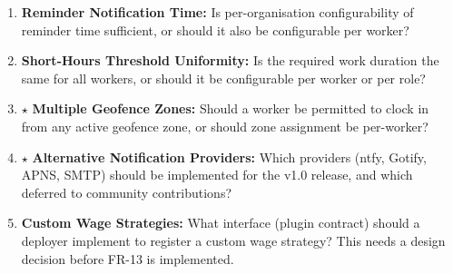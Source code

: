 \documentclass[12pt, a4paper]{article}
\begin{document}
\begin{enumerate}
          an expense offline and the balance would go negative upon sync,
          how should the conflict be resolved?
    \item \textbf{Reminder Notification Time:} Is per-organisation
          configurability of reminder time sufficient, or should it also
          be configurable per worker?
    \item \textbf{Short-Hours Threshold Uniformity:} Is the required
          work duration the same for all workers, or should it be
          configurable per worker or per role?
    \item $\star$ \textbf{Multiple Geofence Zones:} Should a worker be
          permitted to clock in from any active geofence zone, or should
          zone assignment be per-worker?
    \item $\star$ \textbf{Alternative Notification Providers:}
          Which providers (ntfy, Gotify, APNS, SMTP) should be
          implemented for the v1.0 release, and which deferred to
          community contributions?
    \item \textbf{Custom Wage Strategies:} What interface (plugin
          contract) should a deployer implement to register a custom
          wage strategy? This needs a design decision before FR-13 is
          implemented.
\end{enumerate}
\end{document}
